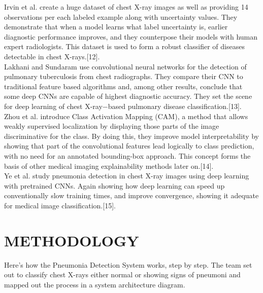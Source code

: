 \documentclass[conference]{IEEEtran}
\begin{document}
Irvin et al. create a huge dataset of chest X-ray images as well as providing 14 observations per each labeled example along with uncertainty values. They demonstrate that when a model learns what label uncertainty is, earlier diagnostic performance improves, and they counterpose their models with human expert radiologists. This dataset is used to form a robust classifier of diseases detectable in chest X-rays.[12].\\
Lakhani and Sundaram use convolutional neural networks for the detection of pulmonary tuberculosis from chest radiographs. They compare their CNN to traditional feature based algorithms and, among other results, conclude that some deep CNNs are capable of highest diagnostic accuracy. They set the scene for deep learning of chest X-ray−based pulmonary disease classification.[13].\\
Zhou et al. introduce Class Activation Mapping (CAM), a method that allows weakly supervised localization by displaying those parts of the image discriminative for the class. By doing this, they improve model interpretability by showing that part of the convolutional features lead logically to class prediction, with no need for an annotated bounding-box approach. This concept forms the basis of other medical imaging explainability methods later on.[14].\\
Ye et al. study pneumonia detection in chest X-ray images using deep learning with pretrained CNNs. Again showing how deep learning can speed up conventionally slow training times, and improve convergence, showing it adequate for medical image classification.[15].\\

\section{\textbf{METHODOLOGY}}
\hspace{0.5cm} Here's how the Pneumonia Detection System works, step by step. The team set out to classify chest X-rays either normal or showing signs of pneumoni and mapped out the process in a system architecture diagram.
\end{document}
